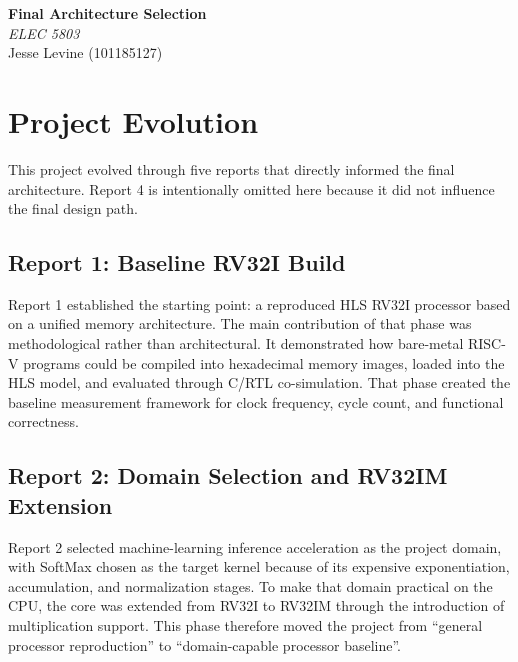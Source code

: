 \documentclass[11pt]{article}
\begin{document}
\begin{titlepage}
    \begin{center}
        \vspace*{2cm}
        \Huge\textbf{Final Architecture Selection} \\
        \vspace{0.25cm}
        \Large\textit{ELEC 5803} \\
        \vspace{2cm}
        \Large Jesse Levine (101185127) \\
        \vfill
    \end{center}
\end{titlepage}

\section{Project Evolution}

This project evolved through five reports that directly informed the final architecture. Report 4 is intentionally omitted here because it did not influence the final design path.

\subsection*{Report 1: Baseline RV32I Build}
Report 1 established the starting point: a reproduced HLS RV32I processor based on a unified memory architecture. The main contribution of that phase was methodological rather than architectural. It demonstrated how bare-metal RISC-V programs could be compiled into hexadecimal memory images, loaded into the HLS model, and evaluated through C/RTL co-simulation. That phase created the baseline measurement framework for clock frequency, cycle count, and functional correctness.

\subsection*{Report 2: Domain Selection and RV32IM Extension}
Report 2 selected machine-learning inference acceleration as the project domain, with SoftMax chosen as the target kernel because of its expensive exponentiation, accumulation, and normalization stages. To make that domain practical on the CPU, the core was extended from RV32I to RV32IM through the introduction of multiplication support. This phase therefore moved the project from ``general processor reproduction'' to ``domain-capable processor baseline''.
\end{document}
